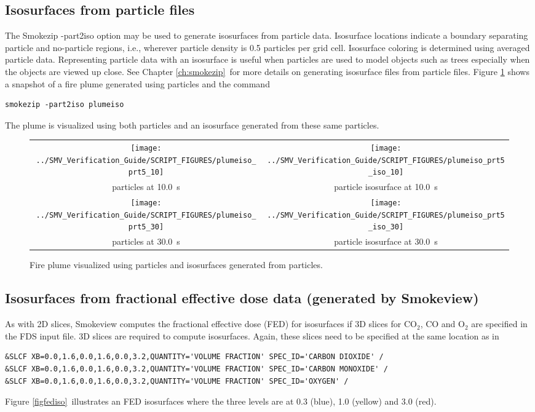 \documentclass[11pt,twoside]{book}
\begin{document}
\subsection{Isosurfaces from particle files}
The Smokezip -part2iso option may be used to generate isosurfaces from particle data.
Isosurface locations indicate a boundary separating particle and
no-particle regions, i.e., wherever particle density is 0.5
particles per grid cell.  Isosurface  coloring is determined using
averaged particle data.  Representing particle data with an
isosurface is useful when particles are used to model objects such
as trees especially when the objects are viewed up close.  See
Chapter \ref{ch:smokezip}\ for more details on generating
isosurface files from particle files.  Figure \ref{figisoparticle}
shows a snapshot of a fire plume generated using particles and the command
\begin{lstlisting}
smokezip -part2iso plumeiso
\end{lstlisting}
The plume is visualized using both particles and an isosurface
generated from these same particles.


\begin{figure}[bph]
\begin{center}
\begin{tabular}{cc}
\texttt{[image: ../SMV\_Verification\_Guide/SCRIPT\_FIGURES/plumeiso\_prt5\_10]}&
\texttt{[image: ../SMV\_Verification\_Guide/SCRIPT\_FIGURES/plumeiso\_prt5\_iso\_10]}\\
particles at 10.0~s&particle isosurface at 10.0~s\\
\texttt{[image: ../SMV\_Verification\_Guide/SCRIPT\_FIGURES/plumeiso\_prt5\_30]}&
\texttt{[image: ../SMV\_Verification\_Guide/SCRIPT\_FIGURES/plumeiso\_prt5\_iso\_30]}\\
particles at 30.0~s&particle isosurface at 30.0~s\\
\end{tabular}
\end{center}
\caption{Fire plume visualized using particles and isosurfaces
generated from  particles.}
\label{figisoparticle}%
\end{figure}

\subsection{Isosurfaces from fractional effective dose data (generated by Smokeview)}
As with 2D slices, Smokeview computes the fractional effective dose (FED) for isosurfaces
if 3D slices for $\mathrm{CO_2}$, CO and $\mathrm{O_2}$ are
specified in the FDS input file.  3D slices are required to compute isosurfaces.
Again, these slices need to be specified at the
same location as in
\begin{lstlisting}
&SLCF XB=0.0,1.6,0.0,1.6,0.0,3.2,QUANTITY='VOLUME FRACTION' SPEC_ID='CARBON DIOXIDE' /
&SLCF XB=0.0,1.6,0.0,1.6,0.0,3.2,QUANTITY='VOLUME FRACTION' SPEC_ID='CARBON MONOXIDE' /
&SLCF XB=0.0,1.6,0.0,1.6,0.0,3.2,QUANTITY='VOLUME FRACTION' SPEC_ID='OXYGEN' /
\end{lstlisting}
Figure \ref{figfediso}\ illustrates
an FED isosurfaces where the three levels are at 0.3 (blue), 1.0 (yellow) and 3.0 (red).
\end{document}
